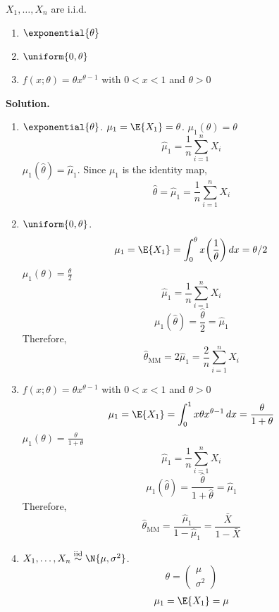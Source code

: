 \begin{Example}{}{}
    $ X_1,\ldots,X_n $ are i.i.d.\
    \begin{enumerate}
        \item $ \exponential{\theta} $
        \item $ \uniform{0,\theta} $
        \item $ f(x;\theta)=\theta x^{\theta-1} $ with $ 0<x<1 $ and $ \theta>0 $
    \end{enumerate}
    \textbf{Solution.}
    \begin{enumerate}
        \item $ \exponential{\theta} $. $ \mu_1=\E{X_1}=\theta $. $ \mu_1(\theta)=\theta $
              \[ \hat{\mu}_1=\frac{1}{n} \sum_{i=1}^{n} X_i \]
              $ \mu_1(\hat{\theta})=\hat{\mu}_1 $. Since $ \mu_1 $ is the identity
              map,
              \[ \hat{\theta}=\hat{\mu}_1=\frac{1}{n} \sum_{i=1}^{n} X_i \]
        \item $ \uniform{0,\theta} $.
              \[ \mu_1=\E{X_1}=\int_{0}^{\theta} x\biggl(\frac{1}{\theta} \biggr)\, d{x}=
                  \theta/2 \]
              $ \mu_1(\theta)=\frac{\theta}{2} $
              \[ \hat{\mu}_1=\frac{1}{n} \sum_{i=1}^{n} X_i \]
              \[ \mu_1(\hat{\theta})=\frac{\hat{\theta}}{2} =\hat{\mu}_1 \]
              Therefore,
              \[ \hat{\theta}_{\text{MM}}=2\hat{\mu}_1=\frac{2}{n} \sum_{i=1}^{n} X_i \]
        \item $ f(x;\theta)=\theta x^{\theta-1} $ with $ 0<x<1 $ and $ \theta>0 $
              \[ \mu_1=\E{X_1}=\int_{0}^{1} x \theta x^{\theta-1}\, d{x}=
                  \frac{\theta}{1+\theta} \]
              $ \displaystyle \mu_1(\theta)=\frac{\theta}{1+\theta} $
              \[ \hat{\mu}_1=\frac{1}{n}\sum_{i=1}^{n}  X_i \]
              \[ \mu_1(\hat{\theta})=\frac{\hat{\theta}}{1+\hat{\theta}}=\hat{\mu}_1 \]
              Therefore,
              \[ \hat{\theta}_{\text{MM}}=\frac{\hat{\mu}_1}{1-\hat{\mu}_1}=\frac{\bar{X}}{1-\bar{X}}   \]
        \item $ X_1,\ldots,X_n\stackrel{\text{iid}}{\sim}\N{\mu,\sigma^2} $.
              \[ \theta=\begin{pmatrix}
                      \mu \\
                      \sigma^2
                  \end{pmatrix} \]
              \begin{align*}
                  \mu_1 & =\E{X_1}=\mu                                  \\

\end{align*}
\end{enumerate}
\end{Example}
